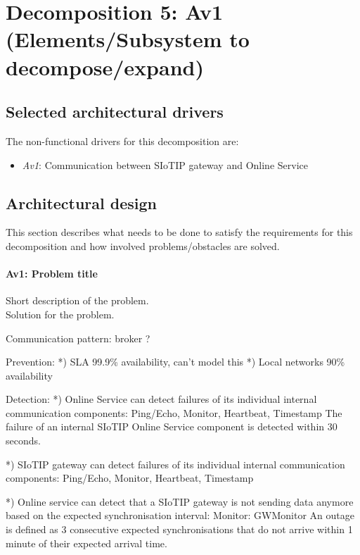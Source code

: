 \section{Decomposition 5: Av1 (Elements/Subsystem to decompose/expand)}


\subsection{Selected architectural drivers}
    The non-functional drivers for this decomposition are:
    \begin{itemize}
    	\item \emph{Av1}: Communication between SIoTIP gateway and Online Service
    \end{itemize}


\subsection{Architectural design}
    This section describes what needs to be done to satisfy the requirements for
    this decomposition and how involved problems/obstacles are solved.

    \paragraph{Av1: Problem title}
        Short description of the problem.\\
        Solution for the problem.

    Communication pattern: broker ?

    Prevention:
        *) SLA 99.9\% availability, can't model this
        *) Local networks 90\% availability

    Detection:
        *) Online Service can detect failures of its individual internal
           communication components:
           Ping/Echo, Monitor, Heartbeat, Timestamp
           The failure of an internal SIoTIP Online Service component is
           detected within 30 seconds.

        *) SIoTIP gateway can detect failures of its individual internal
           communication components:
           Ping/Echo, Monitor, Heartbeat, Timestamp

        *) Online service can detect that a SIoTIP gateway is not sending
           data anymore based on the expected synchronisation interval:
           Monitor: GWMonitor
           An outage is defined as 3 consecutive expected synchronisations
           that do not arrive within 1 minute of their expected arrival time.

